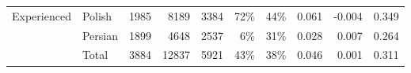 \begin{table}
\begin{tabular}{llrrr|rrrrr}
\cline{1-10}
\multirow{3}{*}{Experienced} & Polish &                  1985 &                       8189 &                  3384 &                    72\% &                                                44\% &                 0.061 &                          -0.004 &       0.349 \\
            & Persian &                  1899 &                       4648 &                  2537 &                     6\% &                                                31\% &                 0.028 &                           0.007 &       0.264 \\
            & Total &                  3884 &                      12837 &                  5921 &                    43\% &                                                38\% &                 0.046 &                           0.001 &       0.311 \\
\bottomrule

\end{tabular}
\label{table:participants}
\end{table}
